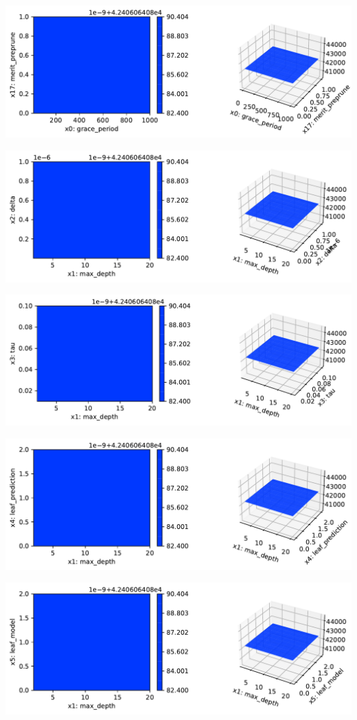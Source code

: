 \documentclass[
  letterpaper,
  DIV=11,
  numbers=noendperiod]{scrreprt}
\begin{document}
\includegraphics{024_spot_hpt_river_friedman_hatr_files/figure-pdf/cell-42-output-15.pdf}

\includegraphics{024_spot_hpt_river_friedman_hatr_files/figure-pdf/cell-42-output-16.pdf}

\includegraphics{024_spot_hpt_river_friedman_hatr_files/figure-pdf/cell-42-output-17.pdf}

\includegraphics{024_spot_hpt_river_friedman_hatr_files/figure-pdf/cell-42-output-18.pdf}

\includegraphics{024_spot_hpt_river_friedman_hatr_files/figure-pdf/cell-42-output-19.pdf}
\end{document}
